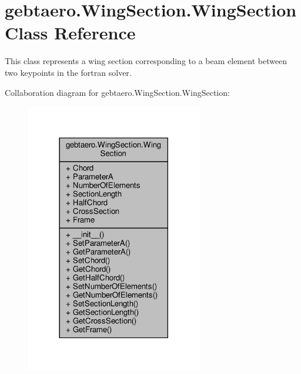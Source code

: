 \hypertarget{classgebtaero_1_1_wing_section_1_1_wing_section}{}\section{gebtaero.\+Wing\+Section.\+Wing\+Section Class Reference}
\label{classgebtaero_1_1_wing_section_1_1_wing_section}


This class represents a wing section corresponding to a beam element between two keypoints in the fortran solver.  




Collaboration diagram for gebtaero.\+Wing\+Section.\+Wing\+Section\+:\nopagebreak
\begin{figure}[H]
\begin{center}
\leavevmode
\includegraphics[width=218pt]{classgebtaero_1_1_wing_section_1_1_wing_section__coll__graph}
\end{center}
\end{figure}
